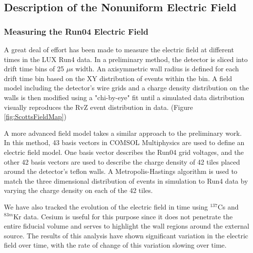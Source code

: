 \subsection{Description of the Nonuniform Electric Field}

\subsubsection{Measuring the Run04 Electric Field} \label{section:DescribingField}

A great deal of effort has been made to measure the electric field at different times in the LUX Run4 data.  In a preliminary method, the detector is sliced into drift time bins of 25 $\mu$s width.  An axisymmetric wall radius is defined for each drift time bin based on the XY distribution of events within the bin.  A field model including the detector's wire grids and a charge density distribution on the walls is then modified using a "chi-by-eye" fit until a simulated data distribution visually reproduces the RvZ event distribution in data. (Figure \ref{fig:ScottsFieldMap}) \cite{ScottsMap}

A more advanced field model takes a similar approach to the preliminary work.  In this method, 43 basis vectors in COMSOL Multiphysics are used to define an electric field model.  One basis vector describes the Run04 grid voltages, and the other 42 basis vectors are used to describe the charge density of 42 tiles placed around the detector's teflon walls.  A Metropolis-Hastings algorithm is used to match the three dimensional distribution of events in simulation to Run4 data by varying the charge density on each of the 42 tiles.  \cite{LuciesMap} 

We have also tracked the evolution of the electric field in time using $^{137}$Cs and $^{83m}$Kr data.  Cesium is useful for this purpose since it does not penetrate the entire fiducial volume and serves to highlight the wall regions around the external source.  The results of this analysis have shown significant variation in the electric field over time, with the rate of change of this variation slowing over time. \cite{FieldOverTime}


